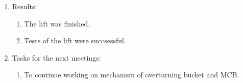 \begin{enumerate}
\begin{enumerate}
    \end{enumerate}
    
	\item Results:  
	\begin{enumerate}
	  \item The lift was finished.
	  
	  \item Tests of the lift were succsessful.
	  
    \end{enumerate}
    
	\item Tasks for the next meetings:
	\begin{enumerate}
	  \item To continue working on mechanism of overturning bucket and MCB.
	  
    \end{enumerate}     
\end{enumerate}
\fillpage

